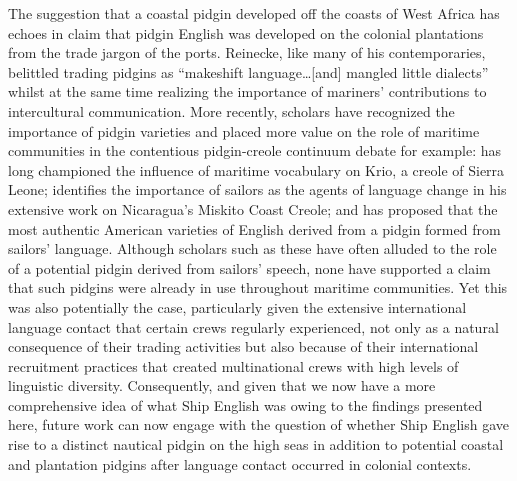 The suggestion that a coastal pidgin developed off the coasts of West Africa has echoes in  claim that pidgin English was developed on the colonial plantations from the trade jargon of the ports. Reinecke, like many of his contemporaries, belittled trading pidgins as “makeshift language…[and] mangled little dialects” \citep[107]{Reinecke1938} whilst at the same time realizing the importance of mariners’ contributions to intercultural communication. More recently, scholars have recognized the importance of pidgin varieties and placed more value on the role of maritime communities in the contentious pidgin-creole continuum debate \citep[7,]{Holm1988} for example: \citet{Hancock1976} has long championed the influence of maritime vocabulary on Krio, a creole of Sierra Leone; \citet{Holm1981} identifies the importance of sailors as the agents of language change in his extensive work on Nicaragua’s Miskito Coast Creole; and \citet{Dillard1992} has proposed that the most authentic American varieties of English derived from a pidgin formed from sailors’ language. Although scholars such as these have often alluded to the role of a potential pidgin derived from sailors’ speech, none have supported a claim that such pidgins were already in use throughout maritime communities. Yet this was also potentially the case, particularly given the extensive international language contact that certain crews regularly experienced, not only as a natural consequence of their trading activities but also because of their international recruitment practices that created multinational crews with high levels of linguistic diversity. Consequently, and given that we now have a more comprehensive idea of what Ship English was owing to the findings presented here, future work can now engage with the question of whether Ship English gave rise to a distinct nautical pidgin on the high seas in addition to potential coastal and plantation pidgins after language contact occurred in colonial contexts. 

